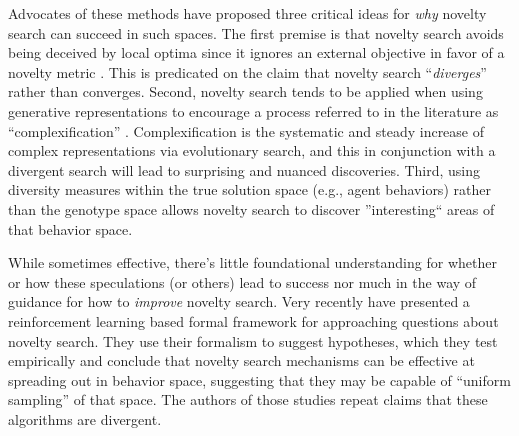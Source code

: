 \documentclass[twoside]{article}
\begin{document}
Advocates of these methods have proposed three critical ideas for \emph{why} novelty search can succeed in such spaces.  The first premise is that novelty search avoids being deceived by local optima since it ignores an external objective in favor of a novelty metric \citep{Lehman2011ecj}.  This is predicated on the claim that novelty search ``\emph{diverges}'' rather than converges.  Second, novelty search tends to be applied when using generative representations \citep{LehmanStanley2008ssls} to encourage a process referred to in the literature as ``complexification'' \citep{StanleyMiikkulainen2004jair}.  Complexification is the systematic and steady increase of complex representations via evolutionary search, and this in conjunction with a divergent search will lead to surprising and nuanced discoveries.  Third, using diversity measures within the true solution space (e.g., agent behaviors) rather than the genotype space allows novelty search to discover ''interesting`` areas of that behavior space.  

While sometimes effective, there's little foundational understanding for whether or how these speculations (or others) lead to success nor much in the way of guidance for how to \emph{improve} novelty search.  Very recently \citet{Doncieux2020gecco,Doncieux2019gecco} have presented a reinforcement learning based formal framework for approaching questions about novelty search.  They use their formalism to suggest hypotheses, which they test empirically and conclude that novelty search mechanisms can be effective at spreading out in behavior space, suggesting that they may be capable of ``uniform sampling'' of that space.  The authors of those studies repeat claims that these algorithms are divergent.   

\end{document}
